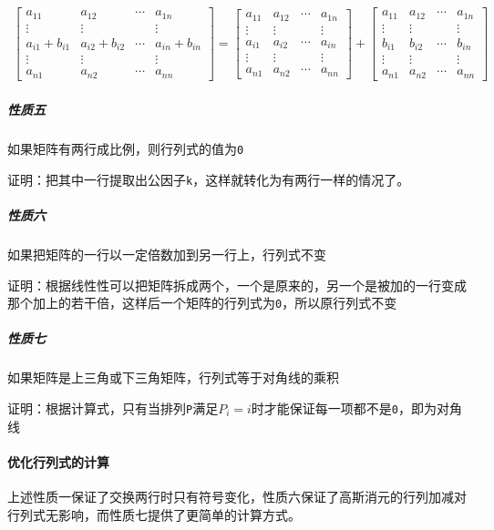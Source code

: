 \documentclass[UTF-8]{ctexart}
\begin{document}
	\begin{align}
	\begin{bmatrix} a _ {11} & a _ {12} & \cdots & a _ {1n} \\ \vdots & \vdots &  & \vdots \\ a _ {i1}+b _ {i1} & a _ {i2}+b _ {i2} & \cdots & a _ {in}+b _ {in} \\ \vdots & \vdots &  & \vdots \\ a _ {n1} & a _ {n2} & \cdots & a _ {nn} \end{bmatrix} = \begin{bmatrix} a _ {11} & a _ {12} & \cdots & a _ {1n} \\ \vdots & \vdots &  & \vdots \\ a _ {i1} & a _ {i2} & \cdots & a _ {in} \\ \vdots & \vdots &  & \vdots \\ a _ {n1} & a _ {n2} & \cdots & a _ {nn} \end{bmatrix} + \begin{bmatrix} a _ {11} & a _ {12} & \cdots & a _ {1n} \\ \vdots & \vdots &  & \vdots \\ b _ {i1} & b _ {i2} & \cdots & b _ {in} \\ \vdots & \vdots &  & \vdots \\ a _ {n1} & a _ {n2} & \cdots & a _ {nn} \end{bmatrix}\nonumber
	\end{align}
	
	\subparagraph{性质五} 如果矩阵有两行成比例，则行列式的值为\texttt{0}
	
	证明：把其中一行提取出公因子\texttt{k}，这样就转化为有两行一样的情况了。
	
	\subparagraph{性质六} 如果把矩阵的一行以一定倍数加到另一行上，行列式不变
	
	证明：根据线性性可以把矩阵拆成两个，一个是原来的，另一个是被加的一行变成那个加上的若干倍，这样后一个矩阵的行列式为\texttt{0}，所以原行列式不变
	
	\subparagraph{性质七} 如果矩阵是上三角或下三角矩阵，行列式等于对角线的乘积
	
	证明：根据计算式，只有当排列\texttt{P}满足$P _ i=i$时才能保证每一项都不是\texttt{0}，即为对角线
	
	\paragraph{优化行列式的计算} 上述性质一保证了交换两行时只有符号变化，性质六保证了高斯消元的行列加减对行列式无影响，而性质七提供了更简单的计算方式。
	
\end{document}

